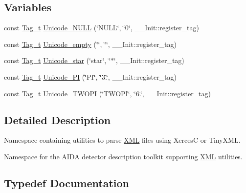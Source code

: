 \subsection*{Variables}
\begin{DoxyCompactItemize}
\item 
const \hyperlink{class_d_d4hep_1_1_x_m_l_1_1_tag__t}{Tag\+\_\+t} \hyperlink{namespace_d_d4hep_1_1_x_m_l_af00c09760c810b5f8ce25c7becedbec4}{Unicode\+\_\+\+N\+U\+LL} (\char`\"{}N\+U\+LL\char`\"{}, \char`\"{}0\char`\"{}, \+\_\+\+\_\+\+Init\+::register\+\_\+tag)
\item 
const \hyperlink{class_d_d4hep_1_1_x_m_l_1_1_tag__t}{Tag\+\_\+t} \hyperlink{namespace_d_d4hep_1_1_x_m_l_a9d7a489ad1c7479f1f8905d8d0355e05}{Unicode\+\_\+empty} (\char`\"{}\char`\"{}, \char`\"{}\char`\"{}, \+\_\+\+\_\+\+Init\+::register\+\_\+tag)
\item 
const \hyperlink{class_d_d4hep_1_1_x_m_l_1_1_tag__t}{Tag\+\_\+t} \hyperlink{namespace_d_d4hep_1_1_x_m_l_a9c5a99a4c53c8e2863e423fa4d498dab}{Unicode\+\_\+star} (\char`\"{}star\char`\"{}, \char`\"{}$\ast$\char`\"{}, \+\_\+\+\_\+\+Init\+::register\+\_\+tag)
\item 
const \hyperlink{class_d_d4hep_1_1_x_m_l_1_1_tag__t}{Tag\+\_\+t} \hyperlink{namespace_d_d4hep_1_1_x_m_l_a7b86f0b182e853fca5f97466cd7767b8}{Unicode\+\_\+\+PI} (\char`\"{}PI\char`\"{}, \char`\"{}3.\char`\"{}, \+\_\+\+\_\+\+Init\+::register\+\_\+tag)
\item 
const \hyperlink{class_d_d4hep_1_1_x_m_l_1_1_tag__t}{Tag\+\_\+t} \hyperlink{namespace_d_d4hep_1_1_x_m_l_ac948f17a359f598cab29aa94191144fc}{Unicode\+\_\+\+T\+W\+O\+PI} (\char`\"{}T\+W\+O\+PI\char`\"{}, \char`\"{}6.\char`\"{}, \+\_\+\+\_\+\+Init\+::register\+\_\+tag)
\end{DoxyCompactItemize}


\subsection{Detailed Description}
Namespace containing utilities to parse \hyperlink{namespace_d_d4hep_1_1_x_m_l}{X\+ML} files using XercesC or Tiny\+X\+ML. 

Namespace for the A\+I\+DA detector description toolkit supporting \hyperlink{namespace_d_d4hep_1_1_x_m_l}{X\+ML} utilities. 

\subsection{Typedef Documentation}
\hypertarget{namespace_d_d4hep_1_1_x_m_l_a5c19b7116be99d69b4b22d911357baaf}{}\label{namespace_d_d4hep_1_1_x_m_l_a5c19b7116be99d69b4b22d911357baaf} 
